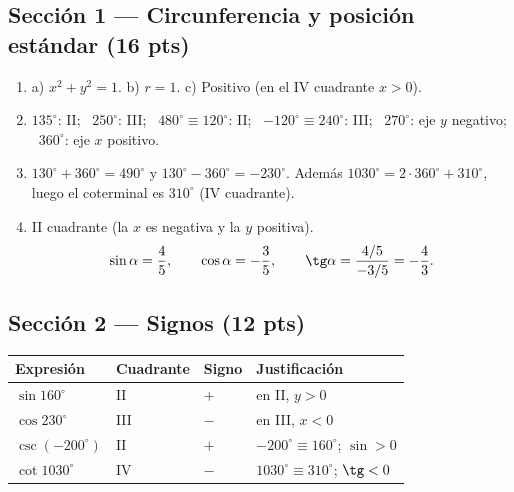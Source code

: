 \documentclass[12pt, letterpaper]{article}
\providecommand{\sen}{\sin}
\begin{document}
\subsection*{Sección 1 — Circunferencia y posición estándar (16 pts)}
\begin{enumerate}[leftmargin=*, label=\textbf{\arabic*.}]
  \item a) $x^2+y^2=1$. \quad b) $r=1$. \quad c) Positivo (en el IV cuadrante $x>0$).
  \item $135^\circ$: II; \ $250^\circ$: III; \ $480^\circ\equiv120^\circ$: II; \
        $-120^\circ\equiv240^\circ$: III; \ $270^\circ$: eje $y$ negativo; \
        $360^\circ$: eje $x$ positivo.
  \item $130^\circ+360^\circ=490^\circ$ y $130^\circ-360^\circ=-230^\circ$.
        Además $1030^\circ=2\cdot360^\circ+310^\circ$, luego el coterminal es
        $310^\circ$ (IV cuadrante).
  \item II cuadrante (la $x$ es negativa y la $y$ positiva).
        \[
          \sen\alpha=\frac45,\qquad
          \cos\alpha=-\frac35,\qquad
          \tg\alpha=\frac{4/5}{-3/5}=-\frac43.
        \]
\end{enumerate}

\subsection*{Sección 2 — Signos (12 pts)}
\begin{center}
\renewcommand{\arraystretch}{1.6}
\setlength{\tabcolsep}{9pt}
\begin{tabular}{@{}llll@{}}
  \toprule
  \textbf{Expresión} & \textbf{Cuadrante} & \textbf{Signo} & \textbf{Justificación} \\
  \midrule
  $\sen 160^\circ$  & II  & $+$ & en II, $y>0$ \\
  $\cos 230^\circ$  & III & $-$ & en III, $x<0$ \\
  $\csc(-200^\circ)$ & II & $+$ & $-200^\circ\equiv160^\circ$; $\sen>0$ \\
  $\cot 1030^\circ$ & IV  & $-$ & $1030^\circ\equiv310^\circ$; $\tg<0$ \\
  \bottomrule
\end{tabular}
\end{center}
\end{document}
